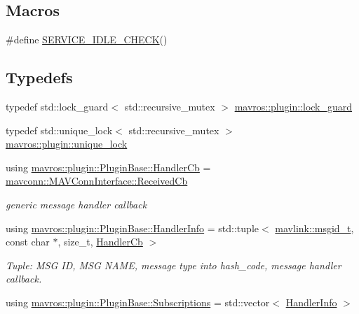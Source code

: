 \subsection*{Macros}
\begin{DoxyCompactItemize}
\item 
\#define \mbox{\hyperlink{group__plugin_ga75baa5fe36b24b82bf055d7ded996c07}{S\+E\+R\+V\+I\+C\+E\+\_\+\+I\+D\+L\+E\+\_\+\+C\+H\+E\+CK}}()
\end{DoxyCompactItemize}
\subsection*{Typedefs}
\begin{DoxyCompactItemize}
\item 
typedef std\+::lock\+\_\+guard$<$ std\+::recursive\+\_\+mutex $>$ \mbox{\hyperlink{group__plugin_ga191dd2c1abfed2baaa71d79dcaf19566}{mavros\+::plugin\+::lock\+\_\+guard}}
\item 
typedef std\+::unique\+\_\+lock$<$ std\+::recursive\+\_\+mutex $>$ \mbox{\hyperlink{group__plugin_gaf461fd7bb3ba3755cdbd6129141f8cca}{mavros\+::plugin\+::unique\+\_\+lock}}
\item 
using \mbox{\hyperlink{group__plugin_ga51d7c95b43e74aa68c80ebe6b171e383}{mavros\+::plugin\+::\+Plugin\+Base\+::\+Handler\+Cb}} = \mbox{\hyperlink{group__mavconn_ga1d04ead963f1685f3aaf4b18ffb49ff7}{mavconn\+::\+M\+A\+V\+Conn\+Interface\+::\+Received\+Cb}}
\begin{DoxyCompactList}\small\item\em generic message handler callback \end{DoxyCompactList}\item 
using \mbox{\hyperlink{group__plugin_gab973eb02b8f26a7b2b9cea37924317f1}{mavros\+::plugin\+::\+Plugin\+Base\+::\+Handler\+Info}} = std\+::tuple$<$ \mbox{\hyperlink{namespacemavlink_a98a1fe49b380ed1ea252d2c13bf3278d}{mavlink\+::msgid\+\_\+t}}, const char $\ast$, size\+\_\+t, \mbox{\hyperlink{group__plugin_ga51d7c95b43e74aa68c80ebe6b171e383}{Handler\+Cb}} $>$
\begin{DoxyCompactList}\small\item\em Tuple\+: M\+SG ID, M\+SG N\+A\+ME, message type into hash\+\_\+code, message handler callback. \end{DoxyCompactList}\item 
using \mbox{\hyperlink{group__plugin_ga8967d61fc77040e0c3ea5a4585d62a09}{mavros\+::plugin\+::\+Plugin\+Base\+::\+Subscriptions}} = std\+::vector$<$ \mbox{\hyperlink{group__plugin_gab973eb02b8f26a7b2b9cea37924317f1}{Handler\+Info}} $>$

\end{DoxyCompactItemize}
